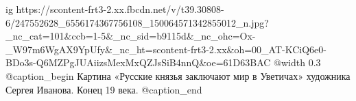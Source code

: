  
 
 
 
 

\ifcmt
  ig https://scontent-frt3-2.xx.fbcdn.net/v/t39.30808-6/247552628_6556174367756108_150064571342855012_n.jpg?_nc_cat=101&ccb=1-5&_nc_sid=b9115d&_nc_ohc=Ox-_W97m6WgAX9YpUfy&_nc_ht=scontent-frt3-2.xx&oh=00_AT-KCiQ6e0-BDo3s-Q6MZPgJUAiizsMexMxQZJsSiB4nnQ&oe=61D63BAC
  @width 0.3
  @caption_begin
    Картина «Русские князья заключают мир в Уветичах» художника Сергея Иванова.
    Конец 19 века.
  @caption_end
\fi
